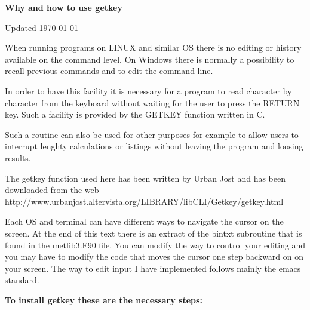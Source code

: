 \documentclass[12pt]{article}
\begin{document}
{\bf \Large Why and how to use getkey}

\bigskip

Updated \today

\bigskip

When running programs on LINUX and similar OS there is no editing or
history available on the command level.  On Windows there is normally
a possibility to recall previous commands and to edit the command
line.

In order to have this facility it is necessary for a program to read
character by character from the keyboard without waiting for the user
to press the RETURN key.  Such a facility is provided by the GETKEY
function written in C.

Such a routine can also be used for other purposes for example to
allow users to interrupt lenghty calculations or listings without
leaving the program and loosing results.

The getkey function used here has been written by Urban Jost and has
been downloaded from the web
http://www.urbanjost.altervista.org/LIBRARY/libCLI/Getkey/getkey.html

Each OS and terminal can have different ways to navigate the cursor on
the screen.  At the end of this text there is an extract of the bintxt
subroutine that is found in the metlib3.F90 file.  You can modify the
way to control your editing and you may have to modify the code that
moves the cursor one step backward on on your screen.  The way to edit
input I have implemented follows mainly the emacs standard.

\bigskip

{\bf To install getkey these are the necessary steps:}
\end{document}

